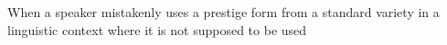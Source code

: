When a speaker mistakenly uses a prestige form from a standard variety in a linguistic context where it is not supposed to be used
